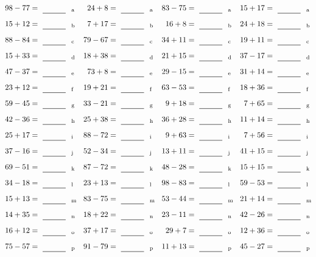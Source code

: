 \documentclass
[
  draft    = true,
  fontsize = 11pt,
  parskip  = half-
]
{scrartcl}
\begin{document}
\clearpage
\begin{align*}
    \pline{98-77}&=\rline{a}
  & \pline{24+8}&=\rline{a}
  & \pline{83-75}&=\rline{a}
  & \pline{15+17}&=\rline{a} \\[1ex]
    \pline{15+12}&=\rline{b}
  & \pline{7+17}&=\rline{b}
  & \pline{16+8}&=\rline{b}
  & \pline{24+18}&=\rline{b} \\[1ex]
    \pline{88-84}&=\rline{c}
  & \pline{79-67}&=\rline{c}
  & \pline{34+11}&=\rline{c}
  & \pline{19+11}&=\rline{c} \\[1ex]
    \pline{15+33}&=\rline{d}
  & \pline{18+38}&=\rline{d}
  & \pline{21+15}&=\rline{d}
  & \pline{37-17}&=\rline{d} \\[1ex]
    \pline{47-37}&=\rline{e}
  & \pline{73+8}&=\rline{e}
  & \pline{29-15}&=\rline{e}
  & \pline{31+14}&=\rline{e} \\[1ex]
    \pline{23+12}&=\rline{f}
  & \pline{19+21}&=\rline{f}
  & \pline{63-53}&=\rline{f}
  & \pline{18+36}&=\rline{f} \\[1ex]
    \pline{59-45}&=\rline{g}
  & \pline{33-21}&=\rline{g}
  & \pline{9+18}&=\rline{g}
  & \pline{7+65}&=\rline{g} \\[1ex]
    \pline{42-36}&=\rline{h}
  & \pline{25+38}&=\rline{h}
  & \pline{36+28}&=\rline{h}
  & \pline{11+14}&=\rline{h} \\[1ex]
    \pline{25+17}&=\rline{i}
  & \pline{88-72}&=\rline{i}
  & \pline{9+63}&=\rline{i}
  & \pline{7+56}&=\rline{i} \\[1ex]
    \pline{37-16}&=\rline{j}
  & \pline{52-34}&=\rline{j}
  & \pline{13+11}&=\rline{j}
  & \pline{41+15}&=\rline{j} \\[1ex]
    \pline{69-51}&=\rline{k}
  & \pline{87-72}&=\rline{k}
  & \pline{48-28}&=\rline{k}
  & \pline{15+15}&=\rline{k} \\[1ex]
    \pline{34-18}&=\rline{l}
  & \pline{23+13}&=\rline{l}
  & \pline{98-83}&=\rline{l}
  & \pline{59-53}&=\rline{l} \\[1ex]
    \pline{15+13}&=\rline{m}
  & \pline{83-75}&=\rline{m}
  & \pline{53-44}&=\rline{m}
  & \pline{21+14}&=\rline{m} \\[1ex]
    \pline{14+35}&=\rline{n}
  & \pline{18+22}&=\rline{n}
  & \pline{23-11}&=\rline{n}
  & \pline{42-26}&=\rline{n} \\[1ex]
    \pline{16+12}&=\rline{o}
  & \pline{37+17}&=\rline{o}
  & \pline{29+7}&=\rline{o}
  & \pline{12+36}&=\rline{o} \\[1ex]
    \pline{75-57}&=\rline{p}
  & \pline{91-79}&=\rline{p}
  & \pline{11+13}&=\rline{p}
  & \pline{45-27}&=\rline{p}
\end{align*}
\end{document}
